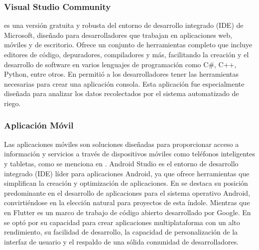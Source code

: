 \subsubsection*{Visual Studio Community}
es una versión gratuita y robusta del entorno de desarrollo integrado (IDE) de Microsoft, diseñado para desarrolladores que trabajan en aplicaciones web, móviles y de escritorio. Ofrece un conjunto de herramientas completo que incluye editores de código, depuradores, compiladores y más, facilitando la creación y el desarrollo de software en varios lenguajes de programación como C\#, C++, Python, entre otros. En \cite{alcivar_dominguez_sistema_2018} permitió a los desarrolladores tener las herramientas necesarias para crear una aplicación consola. Esta aplicación fue especialmente diseñada para analizar los datos recolectados por el sistema automatizado de riego.

\subsubsection*{Aplicación Móvil}
Las aplicaciones móviles son soluciones diseñadas para proporcionar acceso a información y servicios a través de dispositivos móviles como teléfonos inteligentes y tabletas, como se menciona en \cite{noauthor_fuzzy_2023}. Android Studio es el entorno de desarrollo integrado (IDE) líder para aplicaciones Android, ya que ofrece herramientas que simplifican la creación y optimización de aplicaciones. En \cite{castillo_herrero_desarrollo_2020} se destaca su posición predominante en el desarrollo de aplicaciones para el sistema operativo Android, convirtiéndose en la elección natural para proyectos de esta índole. Mientras que en Flutter es un marco de trabajo de código abierto desarrollado por Google. En \cite{ramos_galindo_diseno_2023} se optó por su capacidad para crear aplicaciones multiplataforma con un alto rendimiento, su facilidad de desarrollo, la capacidad de personalización de la interfaz de usuario y el respaldo de una sólida comunidad de desarrolladores.


